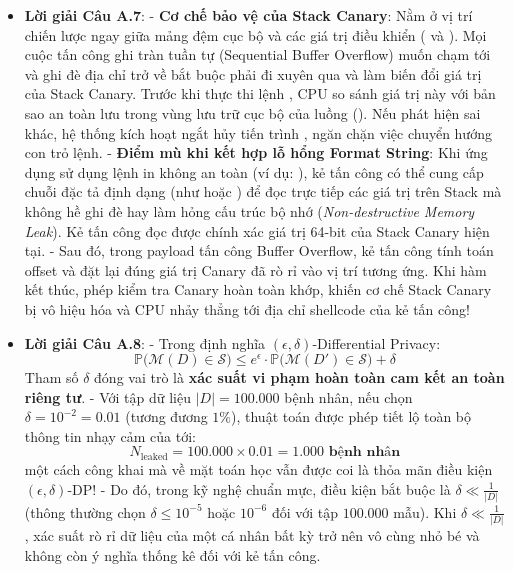 \begin{itemize}
  \item \textbf{Lời giải Câu A.7}:
  - \textbf{Cơ chế bảo vệ của Stack Canary}: Nằm ở vị trí chiến lược ngay giữa mảng đệm cục bộ và các giá trị điều khiển ( và ). Mọi cuộc tấn công ghi tràn tuần tự (Sequential Buffer Overflow) muốn chạm tới và ghi đè địa chỉ trở về bắt buộc phải đi xuyên qua và làm biến đổi giá trị của Stack Canary. Trước khi thực thi lệnh , CPU so sánh giá trị này với bản sao an toàn lưu trong vùng lưu trữ cục bộ của luồng (). Nếu phát hiện sai khác, hệ thống kích hoạt ngắt hủy tiến trình , ngăn chặn việc chuyển hướng con trỏ lệnh.
  - \textbf{Điểm mù khi kết hợp lỗ hổng Format String}: Khi ứng dụng sử dụng lệnh in không an toàn (ví dụ: ), kẻ tấn công có thể cung cấp chuỗi đặc tả định dạng (như  hoặc ) để đọc trực tiếp các giá trị trên Stack mà không hề ghi đè hay làm hỏng cấu trúc bộ nhớ (\textit{Non-destructive Memory Leak}). Kẻ tấn công đọc được chính xác giá trị 64-bit của Stack Canary hiện tại.
  - Sau đó, trong payload tấn công Buffer Overflow, kẻ tấn công tính toán offset và đặt lại đúng giá trị Canary đã rò rỉ vào vị trí tương ứng. Khi hàm kết thúc, phép kiểm tra Canary hoàn toàn khớp, khiến cơ chế Stack Canary bị vô hiệu hóa và CPU nhảy thẳng tới địa chỉ shellcode của kẻ tấn công!

  \item \textbf{Lời giải Câu A.8}:
  - Trong định nghĩa $(\epsilon, \delta)$-Differential Privacy:
  \begin{equation*}
  \mathbb{P}\big(\mathcal{M}(D) \in \mathcal{S}\big) \le e^\epsilon \cdot \mathbb{P}\big(\mathcal{M}(D') \in \mathcal{S}\big) + \delta
  \end{equation*}
  Tham số $\delta$ đóng vai trò là \textbf{xác suất vi phạm hoàn toàn cam kết an toàn riêng tư}.
  - Với tập dữ liệu $|D| = 100.000$ bệnh nhân, nếu chọn $\delta = 10^{-2} = 0.01$ (tương đương $1\%$), thuật toán được phép tiết lộ toàn bộ thông tin nhạy cảm của tới:
  \begin{equation*}
  N_{\text{leaked}} = 100.000 \times 0.01 = \mathbf{1.000 \text{ bệnh nhân}}
  \end{equation*}
  một cách công khai mà về mặt toán học vẫn được coi là thỏa mãn điều kiện $(\epsilon, \delta)$-DP!
  - Do đó, trong kỹ nghệ chuẩn mực, điều kiện bắt buộc là $\delta \ll \frac{1}{|D|}$ (thông thường chọn $\delta \le 10^{-5}$ hoặc $10^{-6}$ đối với tập $100.000$ mẫu). Khi $\delta \ll \frac{1}{|D|}$, xác suất rò rỉ dữ liệu của một cá nhân bất kỳ trở nên vô cùng nhỏ bé và không còn ý nghĩa thống kê đối với kẻ tấn công.
\end{itemize}

